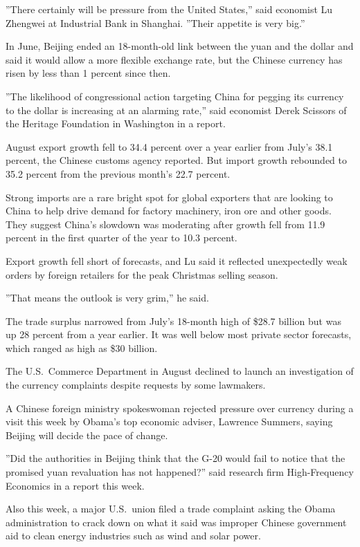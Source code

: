 ﻿\documentclass[12pt]{article}
\begin{document}
''There certainly will be pressure from the United States,'' said economist Lu Zhengwei at
Industrial Bank in Shanghai. ''Their appetite is very big.''

In June, Beijing ended an 18-month-old link between the yuan and the dollar and said it would allow
a more flexible exchange rate, but the Chinese currency has risen by less than 1 percent since then.

''The likelihood of congressional action targeting China for pegging its currency to the dollar is
increasing at an alarming rate,'' said economist Derek Scissors of the Heritage Foundation in
Washington in a report.

August export growth fell to 34.4 percent over a year earlier from July's 38.1 percent, the Chinese
customs agency reported. But import growth rebounded to 35.2 percent from the previous month's 22.7
percent.

Strong imports are a rare bright spot for global exporters that are looking to China to help drive
demand for factory machinery, iron ore and other goods. They suggest China's slowdown was moderating
after growth fell from 11.9 percent in the first quarter of the year to 10.3 percent.

Export growth fell short of forecasts, and Lu said it reflected unexpectedly weak orders by foreign
retailers for the peak Christmas selling season.

''That means the outlook is very grim,'' he said.

The trade surplus narrowed from July's 18-month high of \$28.7 billion but was up 28 percent from a
year earlier. It was well below most private sector forecasts, which ranged as high as \$30 billion.

The U.S.~Commerce Department in August declined to launch an investigation of the currency
complaints despite requests by some lawmakers.

A Chinese foreign ministry spokeswoman rejected pressure over currency during a visit this week by
Obama's top economic adviser, Lawrence Summers, saying Beijing will decide the pace of change.

''Did the authorities in Beijing think that the G-20 would fail to notice that the promised yuan
revaluation has not happened?'' said research firm High-Frequency Economics in a report this week.

Also this week, a major U.S.~union filed a trade complaint asking the Obama administration to crack
down on what it said was improper Chinese government aid to clean energy industries such as wind and
solar power.
\end{document}
